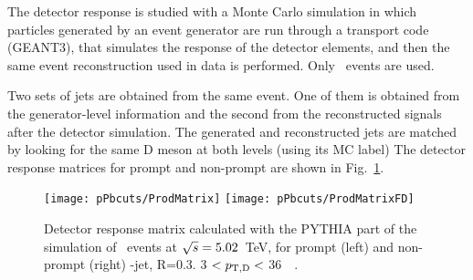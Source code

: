 The detector response is studied with a Monte Carlo simulation in which particles generated by an event generator are
run through a transport code (GEANT3), that simulates the response of the detector elements, and then the same event reconstruction used in data is performed. Only \ccbar\ events are used.

Two sets of jets are obtained from the same event. One of them is obtained from the generator-level information and the second from the reconstructed signals after the detector simulation. 
The generated and reconstructed jets are matched by looking for the same D meson at both levels (using its MC label)
The detector response matrices for prompt and non-prompt are shown in Fig.~\ref{fig:fRMdet_pPb_Dzero}.

\begin{figure}[bth]
\centering
\texttt{[image: pPbcuts/ProdMatrix]}
\texttt{[image: pPbcuts/ProdMatrixFD]}
\caption{Detector response matrix calculated with the PYTHIA part of the simulation of \pp\ events at $\sqrt{s}=5.02$~TeV, for prompt (left) and non-prompt (right) \Dzero-jet, R=0.3. 3 $< p_{\mathrm{T,D}} < $ 36~\GeVc\ .}
\label{fig:fRMdet_pPb_Dzero}
\end{figure}

